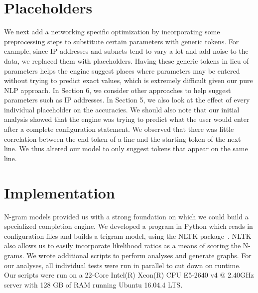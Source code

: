 \documentclass[../thesis.tex]{subfiles}
\begin{document}
\section{Placeholders}
We next add a networking specific optimization by incorporating some preprocessing steps to substitute certain parameters with generic tokens. For example, since IP addresses and subnets tend to vary a lot and add noise to the data, we replaced them with placeholders. Having these generic tokens in lieu of parameters helps the engine suggest places where parameters may be entered without trying to predict exact values, which is extremely difficult given our pure NLP approach. In Section 6, we consider other approaches to help suggest parameters such as IP addresses. In Section 5, we also look at the effect of every individual placeholder on the accuracies. We should also note that our initial analysis showed that the engine was trying to predict what the user would enter after a complete configuration statement. We observed that there was little correlation between the end token of a line and the starting token of the next line. We thus altered our model to only suggest tokens that appear on the same line.\\

\section{Implementation}

N-gram models provided us with a strong foundation on which we could build a specialized completion engine. We developed a program in Python which reads in configuration files and builds a trigram model, using the NLTK package~\cite{nltk}. NLTK also allows us to easily incorporate likelihood ratios as a means of scoring the N-grams. We wrote additional scripts to perform analyses and generate graphs. For our analyses, all individual tests were run in parallel to cut down on runtime. Our scripts were run on a 22-Core Intel(R) Xeon(R) CPU E5-2640 v4 @ 2.40GHz server with 128 GB of RAM running Ubuntu 16.04.4 LTS.\\ 
\end{document}
